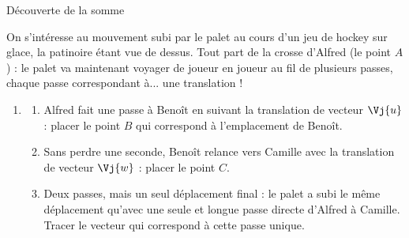 \documentclass[a4paper,11pt,french]{report}
\begin{document}
\pagestyle{empty}

\newcommand{\SequenceTitre}[3]{%
  \begin{center}
  \begin{tcolorbox}[
    enhanced,
    width=#1\linewidth,
    colback=white,
    colframe=black,
    boxrule=0.8pt,
    arc=8pt,
    sharp corners=downhill,
    left=10pt, right=10pt, top=8pt, bottom=6pt,
    halign=center,
    overlay={
      \node[fill=white, anchor=west, font=\normalsize, inner xsep=4pt]
        at ([xshift=14pt]frame.north west) {#2};
    },
  ]
  {\huge #3}
  \end{tcolorbox}
  \end{center}
}


\newcommand{\Palet}[1]{\node[draw,circle,inner sep=1.3pt] at #1 {\tiny$+$};}

\SequenceTitre{0.78}{Séquence 2}{Découverte de la somme}
\vspace{4pt}

On s'intéresse au mouvement subi par le palet au cours d'un jeu de hockey sur glace, la patinoire étant vue de dessus. Tout part de la crosse d'Alfred (le point $A$) : le palet va maintenant voyager de joueur en joueur au fil de plusieurs passes, chaque passe correspondant à... une translation !

\begin{enumerate}
\item
\begin{enumerate}
\item Alfred fait une passe à Benoît en suivant la translation de vecteur $\Vj{u}$ : placer le point $B$ qui correspond à l'emplacement de Benoît.
\item Sans perdre une seconde, Benoît relance vers Camille avec la translation de vecteur $\Vj{w}$ : placer le point $C$.
\item Deux passes, mais un seul déplacement final : le palet a subi le même déplacement qu'avec une seule et longue passe directe d'Alfred à Camille. Tracer le vecteur qui correspond à cette passe unique.
\end{enumerate}
\end{enumerate}
\end{document}
